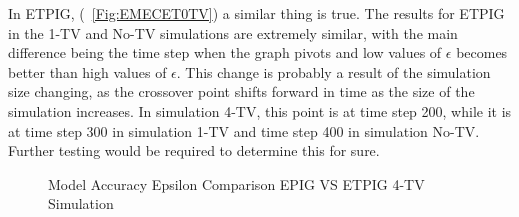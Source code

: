 \documentclass[12pt]{thesis}
\begin{document}
In ETPIG, (\figurename~\ref{Fig:EMECET0TV}) a similar thing is true. The results for ETPIG in the 1-TV and No-TV simulations are extremely similar, with the main difference being the time step when the graph pivots and low values of $\epsilon$ becomes better than high values of $\epsilon$. This change is probably a result of the simulation size changing, as the crossover point shifts forward in time as the size of the simulation increases. In simulation 4-TV, this point is at time step 200, while it is at time step 300 in simulation 1-TV and time step 400 in simulation No-TV. Further testing would be required to determine this for sure.
\begin{figure}
	\begin{center}
		\hfill
		\hfill
	\end{center}
	\caption{Model Accuracy Epsilon Comparison EPIG VS ETPIG 4-TV Simulation}
	\label{Fig:EAEC4TV}
\end{figure}
\end{document}
